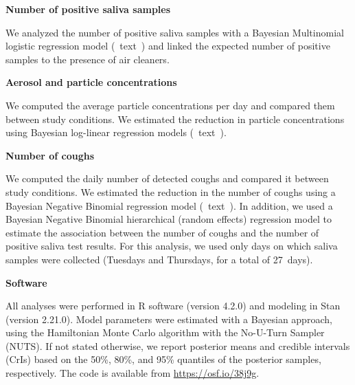 \documentclass[fleqn,11pt]{wlscirep}
\begin{document}
\noindent\textbf{Number of positive saliva samples} \smallskip

\noindent We analyzed the number of positive saliva samples with a Bayesian Multinomial logistic regression model (\supp~text~) and linked the expected number of positive samples to the presence of air cleaners. \medskip %

\noindent\textbf{Aerosol and particle concentrations} \smallskip

\noindent We computed the average particle concentrations per day and compared them between study conditions. We estimated the reduction in particle concentrations using Bayesian log-linear regression models (\supp~text~). \medskip %

\noindent\textbf{Number of coughs} \smallskip

\noindent We computed the daily number of detected coughs and compared it between study conditions. We estimated the reduction in the number of coughs using a Bayesian Negative Binomial regression model (\supp~text~). %
In addition, we used a Bayesian Negative Binomial hierarchical (random effects) regression model to estimate the association between the number of coughs and the number of positive saliva test results. For this analysis, we used only days on which saliva samples were collected (Tuesdays and Thursdays, for a total of 27~days).  \medskip

\noindent\textbf{Software} \smallskip

\noindent All analyses were performed in R software (version 4.2.0)\cite{RCoreTeam2022} and modeling in Stan (version 2.21.0)\cite{Carpenter2017}. Model parameters were estimated with a Bayesian approach, using the Hamiltonian Monte Carlo algorithm with the No-U-Turn Sampler (NUTS)\cite{Hoffman2014}. %
If not stated otherwise, we report posterior means and credible intervals (CrIs) based on the 50\%, 80\%, and 95\% quantiles of the posterior samples, respectively. The code is available from \url{https://osf.io/38j9g}.
\end{document}
